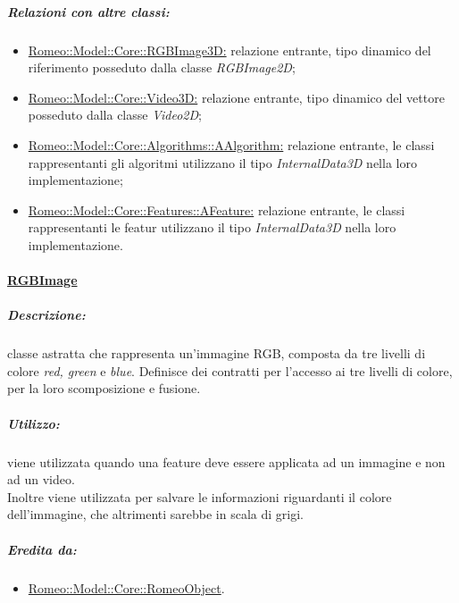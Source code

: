 					\subparagraph{Relazioni con altre classi:}
						\begin{itemize}
							\item \hyperref[]{Romeo::Model::Core::RGBImage3D:} relazione entrante, tipo dinamico del riferimento posseduto dalla classe \textsl{RGBImage2D};
							
							\item \hyperref[]{Romeo::Model::Core::Video3D:} relazione entrante, tipo dinamico del vettore posseduto dalla classe \textsl{Video2D};
							
							\item \hyperref[]{Romeo::Model::Core::Algorithms::AAlgorithm:} relazione entrante, le classi rappresentanti gli algoritmi utilizzano il tipo \textsl{InternalData3D} nella loro implementazione;
							
							\item \hyperref[]{Romeo::Model::Core::Features::AFeature:} relazione entrante, le classi rappresentanti le featur utilizzano il tipo \textsl{InternalData3D} nella loro implementazione.
						\end{itemize}
						
		\paragraph{\underline{RGBImage}}
		\label{RGBImage}
			\subparagraph{Descrizione:} classe astratta che rappresenta un'immagine RGB, composta da tre livelli di colore \textit{red, green} e \textit{blue}. Definisce dei contratti per l'accesso ai tre livelli di colore, per la loro scomposizione e fusione.
			
			\subparagraph{Utilizzo:} viene utilizzata quando una feature\g{}  deve essere applicata ad un immagine e non ad un video.
			\\Inoltre viene utilizzata per salvare le informazioni riguardanti il colore dell'immagine, che altrimenti sarebbe in scala di grigi.
			
			\subparagraph{Eredita da:}
				\begin{itemize}
					\item \hyperref[]{Romeo::Model::Core::RomeoObject}.
				\end{itemize}
				
